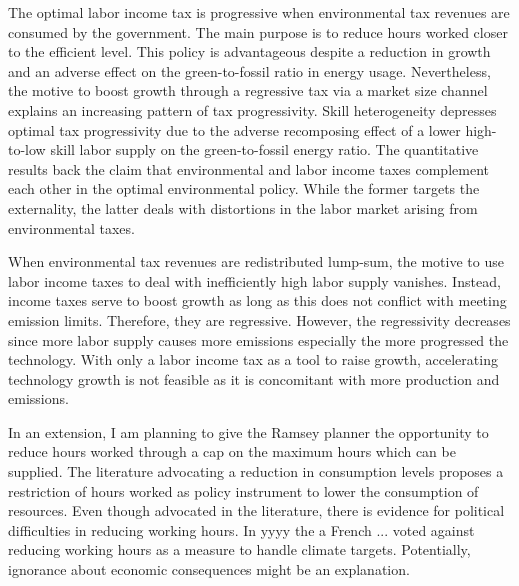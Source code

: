 The optimal labor income tax is progressive when environmental tax revenues are consumed by the government.  The main purpose is to reduce hours worked closer to the efficient level. This policy is advantageous despite a reduction in growth and an adverse effect on the green-to-fossil ratio in energy usage. Nevertheless, the motive to boost growth through a regressive tax via a market size channel explains an increasing pattern of tax progressivity. 
 Skill heterogeneity depresses optimal tax progressivity due to the adverse recomposing effect of a lower high-to-low skill labor supply on the green-to-fossil energy ratio. 
The quantitative results back the claim that environmental and labor income taxes complement each other in the optimal environmental policy. While the former targets the externality, the latter deals with distortions in the labor market arising from environmental taxes. 

When environmental tax revenues are redistributed lump-sum, the motive to use labor income taxes to deal with inefficiently high labor supply vanishes. Instead, income taxes serve to boost growth as long as this does not conflict with meeting emission limits. Therefore, they are regressive. 
However, the regressivity decreases since more labor supply causes more emissions especially the more progressed the technology. With only a labor income tax as a tool to raise growth, accelerating technology growth is not feasible as it is concomitant with more production and emissions. 

In an extension, I am planning to give the Ramsey planner the opportunity to reduce hours worked through a cap on the maximum hours which can be supplied. The literature advocating a reduction in consumption levels \cite{Schor2005SustainableReduction} proposes a restriction of hours worked as policy instrument to lower the consumption of resources.
Even though advocated in the literature, there is evidence for political difficulties in reducing working hours. In yyyy the a French ... voted against reducing working hours as a measure to handle climate targets. Potentially, ignorance about economic consequences might be an explanation. 


